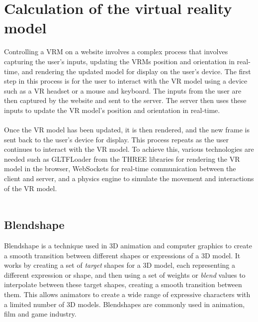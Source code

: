 \section{Calculation of the virtual reality model} 
Controlling a VRM on a website involves a complex process that involves 
capturing the user's inputs, updating the VRMs position and orientation in real-time, 
and rendering the updated model for display on the user's device.
The first step in this process is for the user to interact with the VR model 
using a device such as a VR headset or a mouse and keyboard. The inputs from the 
user are then captured by the website and sent to the server. The server then 
uses these inputs to update the VR model's position and orientation in real-time. 
\\
\\
Once the VR model has been updated, it is then rendered, and the new frame is 
sent back to the user's device for display. This process repeats as the user 
continues to interact with the VR model. 
To achieve this, various technologies are needed such as GLTFLoader\cite{GLTFLoader} from the THREE\cite{threejs}
libraries for rendering the VR model in the browser, WebSockets for real-time 
communication between the client and server, and a physics engine to simulate 
the movement and interactions of the VR model. 
\\
\\
\subsection{Blendshape}
Blendshape is a technique used in 3D animation and computer graphics to create a smooth transition between different shapes or expressions of a 3D model. 
It works by creating a set of \emph{target} shapes for a 3D model, each representing a different expression or shape, 
and then using a set of weights or \emph{blend} values to interpolate between these target shapes, creating a 
smooth transition between them. This allows animators to create a wide range of expressive characters with a 
limited number of 3D models. Blendshapes are commonly used in animation, film and game industry.
\\
\\
